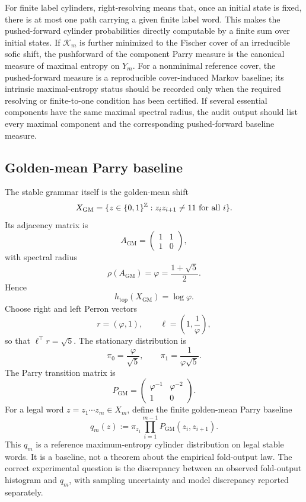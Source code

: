 For finite label cylinders, right-resolving means that, once an initial state is fixed, there is at most one path carrying a given finite label word.  This makes the pushed-forward cylinder probabilities directly computable by a finite sum over initial states.  If \(\mathcal K_m\) is further minimized to the Fischer cover of an irreducible sofic shift, the pushforward of the component Parry measure is the canonical measure of maximal entropy on \(Y_m\).  For a nonminimal reference cover, the pushed-forward measure is a reproducible cover-induced Markov baseline; its intrinsic maximal-entropy status should be recorded only when the required resolving or finite-to-one condition has been certified.  If several essential components have the same maximal spectral radius, the audit output should list every maximal component and the corresponding pushed-forward baseline measure.

\subsection{Golden-mean Parry baseline}
\label{app:golden-parry-baseline}

The stable grammar itself is the golden-mean shift
\[
X_{\mathrm{GM}}=\{z\in\{0,1\}^{\mathbb{Z}}:z_iz_{i+1}\neq 11\text{ for all }i\}.
\]
Its adjacency matrix is
\[
A_{\mathrm{GM}}=
\begin{pmatrix}
1&1\\
1&0
\end{pmatrix},
\]
with spectral radius
\[
\rho(A_{\mathrm{GM}})=\varphi=\frac{1+\sqrt5}{2}.
\]
Hence
\[
h_{\mathrm{top}}(X_{\mathrm{GM}})=\log\varphi.
\]
Choose right and left Perron vectors
\[
r=(\varphi,1),
\qquad
\ell=\left(1,\frac1\varphi\right),
\]
so that \(\ell^\top r=\sqrt5\).  The stationary distribution is
\[
\pi_0=\frac{\varphi}{\sqrt5},
\qquad
\pi_1=\frac{1}{\varphi\sqrt5}.
\]
The Parry transition matrix is
\[
P_{\mathrm{GM}}=
\begin{pmatrix}
\varphi^{-1}&\varphi^{-2}\\
1&0
\end{pmatrix}.
\]
For a legal word \(z=z_1\cdots z_m\in X_m\), define the finite golden-mean Parry baseline
\[
q_m(z):=\pi_{z_1}\prod_{i=1}^{m-1}P_{\mathrm{GM}}(z_i,z_{i+1}).
\]
This \(q_m\) is a reference maximum-entropy cylinder distribution on legal stable words.  It is a baseline, not a theorem about the empirical fold-output law.  The correct experimental question is the discrepancy between an observed fold-output histogram and \(q_m\), with sampling uncertainty and model discrepancy reported separately.

